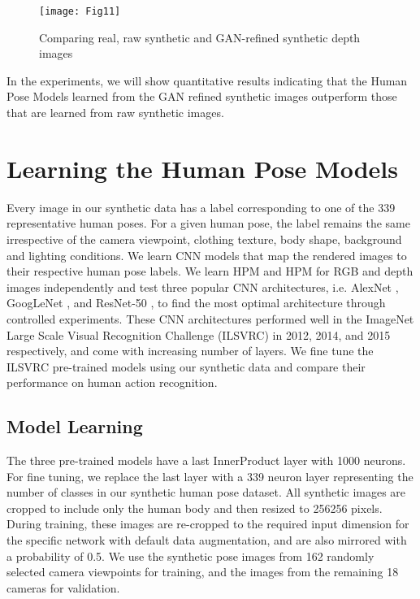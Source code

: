 \documentclass[twocolumn]{svjour3}          \smartqed  \usepackage{graphicx}
\begin{document}
\begin{figure}[t]
\texttt{[image: Fig11]}
\caption{Comparing real, raw synthetic and GAN-refined synthetic depth images}
\label{fig:depth_GAN_compare}
\end{figure}


In the experiments, we will show quantitative results indicating that the Human Pose Models learned from the GAN refined synthetic images outperform those that are learned from raw synthetic images.


\section{Learning the Human Pose Models}

Every image in our synthetic data has a label corresponding to one of the 339 representative human poses. For a given human pose, the label remains the same irrespective of the camera viewpoint, clothing texture, body shape, background and lighting conditions. We learn CNN models that map the rendered images to their respective human pose labels. We learn HPM and HPM for RGB and depth images independently and test three popular CNN architectures, i.e. AlexNet \citep{AlexNet}, GoogLeNet \citep{GoogLeNet}, and ResNet-50 \citep{ResNet}, to find the most optimal architecture through controlled experiments. These CNN architectures performed well in the ImageNet Large Scale Visual Recognition Challenge (ILSVRC) in 2012, 2014, and 2015 respectively, and come with increasing number of layers. We fine tune the ILSVRC pre-trained models using our synthetic data and compare their performance on human action recognition.


\subsection{Model Learning}

The three pre-trained models have a last InnerProduct layer with 1000 neurons. For fine tuning, we replace the last layer with a 339 neuron layer representing the number of classes in our synthetic human pose dataset. All synthetic images are cropped to include only the human body and then resized to 256256 pixels. During training, these images are re-cropped to the required input dimension for the specific network with default data augmentation, and are also mirrored with a probability of 0.5. We use the synthetic pose images from 162 randomly selected camera viewpoints for training, and the images from the remaining 18 cameras for validation.
\end{document}
